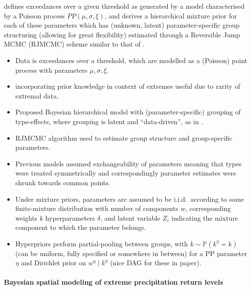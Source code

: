 \documentclass{article}
\numberwithin{equation}{section}
\begin{document}
\cite{Bottolo2003} defines exceedances over a given threshold as generated by a model characterised by a Poisson process $PP(\mu, \sigma, \xi)$, and derives a hierarchical mixture prior for each of these parameters which has (unknown, latent) parameter-specific group structuring (allowing for great flexibility) estimated through a Reversible Jump MCMC (RJMCMC) scheme similar to that of \cite{Rohrbeck2021}. 
\begin{itemize}
  \item Data is exceedances over a threshold, which are modelled as a (Poisson) point process with parameters $\mu, \sigma, \xi$.
  \item incorporating prior knowledge in context of extremes useful due to rarity of extremal data.
  \item Proposed Bayesian hierarchical model with (parameter-specific) grouping of type-effects, where grouping is latent and ``data-driven'', as in \cite{Dupuis2023}. 
  \item RJMCMC algorithm used to estimate group structure and group-specific parameters.
  \item Previous models assumed exchangeability of parameters meaning that types were treated symmetrically and correspondingly parameter estimates were shrunk towards common points. 
  \item Under mixture priors, parameters are assumed to be i.i.d.\ according to some finite-mixture distribution with number of components $w$, corresponding weights $k$ hyperparameters $\delta$, and latent variable $Z_i$ indicating the mixture component to which the parameter belongs.
  \item Hyperpriors perform partial-pooling between groups, with $k \sim \mathbb{P}(k^{\eta} = k)$ (can be uniform, fully specified or somewhere in between) for a PP parameter $\eta$ and Dirichlet prior on $w^{\eta} \mid k^{\eta}$ (nice DAG for these in paper). 
\end{itemize}

\paragraph{Bayesian spatial modeling of extreme precipitation return levels}
\end{document}
